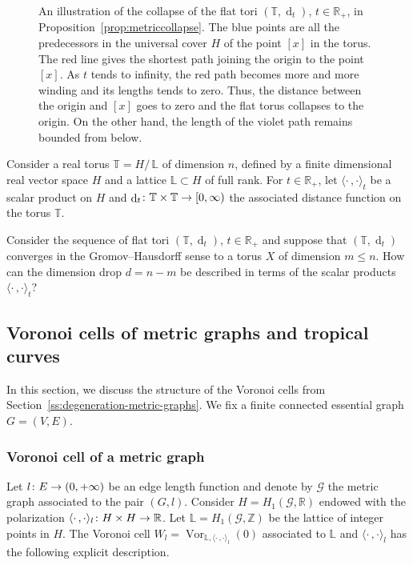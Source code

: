 \documentclass[AHL,Unicode,longabstracts]{cedram}
\newcommand{\innone}[2]{{\langle#2\rangle_{#1}}}
\newcommand{\rquot}[2]{#1/\,#2}
\DeclareMathOperator{\Vor}{Vor}
\DeclareMathOperator{\dist}{d}
\newcommand{\R}{\mathbb{R}}
\newcommand{\Z}{\mathbb{Z}}
\newcommand{\T}{\mathbb{T}}
\renewcommand{\L}{\mathbb{L}}
\newcommand{\mgr}{\mathcal{G}}
\renewcommand*{\to}{\mathchoice{\longrightarrow}{\rightarrow}{\rightarrow}{\rightarrow}}
\begin{document}
\begin{figure}[!hb]
\centering
\scalebox{.30}
{}
\caption{An illustration of the collapse of the flat tori $(\T, \dist_t)$, $t \in \R_+$, in Proposition~\ref{prop:metriccollapse}. The blue points are all the predecessors in the universal cover $H$ of the point $[x]$ in the torus. The red line gives the shortest path joining the origin to the point $[x]$. As $t$ tends to infinity, the red path becomes more and more winding and its lengths tends to zero. Thus, the distance between the origin and $[x]$ goes to zero and the flat torus collapses to the origin. On the other hand, the length of the violet path remains bounded from below.}\label{fig:metric-collapse}
\end{figure}


\begin{ques}
Consider a real torus $\T = \rquot{H}{\L}$ of dimension $n$, defined by a finite dimensional real vector space $H$ and a lattice $\L \subset H$ of full rank. For $t \in \R_+$, let $\innone{t}{\cdot \,, \cdot}$ be a scalar product on $H$ and $\dist_t \colon \T \times \T \to [0, \infty)$ the associated distance function on the torus $\T$.

Consider the sequence of flat tori $(\T, \dist_t)$, $t \in \R_+$ and suppose that $(\T, \dist_t)$ converges in the Gromov--Hausdorff sense to a torus $X$ of dimension $m \le n$. How can the dimension drop $d= n-m$ be described in terms of the scalar products $\innone{t}{\cdot \,, \cdot}$?
\end{ques}



\subsection{Voronoi cells of metric graphs and tropical curves}

In this section, we discuss the structure of the Voronoi cells from Section~\ref{ss:degeneration-metric-graphs}. We fix a finite connected essential graph $G = (V,E)$.

\subsubsection{Voronoi cell of a metric graph} Let $l \colon E \to (0, +\infty)$ be an edge length function and denote by $\mgr$ the metric graph associated to the pair $(G,l)$. Consider $H=H_1(\mgr, \R)$ endowed with the polarization $\innone{l}{\cdot\,,\cdot} \colon H\times H \to\R$. Let $\L =H_1(\mgr, \Z)$ be the lattice of integer points in $H$. The Voronoi cell $W_l = \Vor_{\L, \innone{l}{\cdot\,, \cdot} }(0)$ associated to $\L$ and $\innone{l}{\cdot\,, \cdot}$ has the following explicit description.
\end{document}
